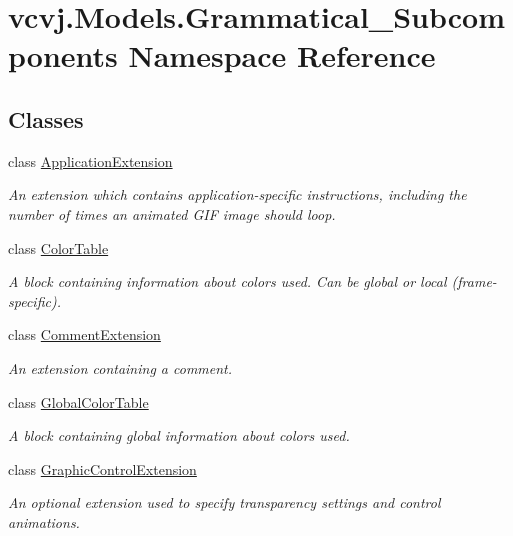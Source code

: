 \hypertarget{namespacevcvj_1_1_models_1_1_grammatical___subcomponents}{}\section{vcvj.\+Models.\+Grammatical\+\_\+\+Subcomponents Namespace Reference}
\label{namespacevcvj_1_1_models_1_1_grammatical___subcomponents}
\subsection*{Classes}
\begin{DoxyCompactItemize}
\item 
class \hyperlink{classvcvj_1_1_models_1_1_grammatical___subcomponents_1_1_application_extension}{Application\+Extension}
\begin{DoxyCompactList}\small\item\em An extension which contains application-\/specific instructions, including the number of times an animated G\+IF image should loop. \end{DoxyCompactList}\item 
class \hyperlink{classvcvj_1_1_models_1_1_grammatical___subcomponents_1_1_color_table}{Color\+Table}
\begin{DoxyCompactList}\small\item\em A block containing information about colors used. Can be global or local (frame-\/specific). \end{DoxyCompactList}\item 
class \hyperlink{classvcvj_1_1_models_1_1_grammatical___subcomponents_1_1_comment_extension}{Comment\+Extension}
\begin{DoxyCompactList}\small\item\em An extension containing a comment. \end{DoxyCompactList}\item 
class \hyperlink{classvcvj_1_1_models_1_1_grammatical___subcomponents_1_1_global_color_table}{Global\+Color\+Table}
\begin{DoxyCompactList}\small\item\em A block containing global information about colors used. \end{DoxyCompactList}\item 
class \hyperlink{classvcvj_1_1_models_1_1_grammatical___subcomponents_1_1_graphic_control_extension}{Graphic\+Control\+Extension}
\begin{DoxyCompactList}\small\item\em An optional extension used to specify transparency settings and control animations. \end{DoxyCompactList}\item 

\end{DoxyCompactItemize}

